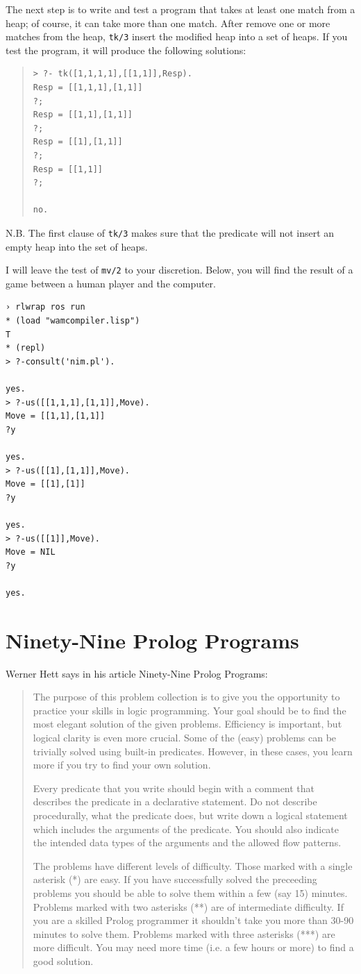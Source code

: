 \documentclass[a4paper,12pt]{book}
\begin{document}
The next step is to write and test a program that takes
at least one match from a heap; of course, it can take
more than one match. After remove one or more matches
from the heap, \verb|tk/3| insert the modified heap into
a set of heaps. If you test the program, it will produce
the following solutions:
\begin{quote}
\begin{verbatim}
> ?- tk([1,1,1,1],[[1,1]],Resp).
Resp = [[1,1,1],[1,1]]
?;
Resp = [[1,1],[1,1]]
?;
Resp = [[1],[1,1]]
?;
Resp = [[1,1]]
?;

no.
\end{verbatim}
\end{quote}
N.B. The first clause of \verb|tk/3| makes sure that the
predicate will not insert an empty heap into the set of heaps.

I will leave the test of \verb|mv/2| to your discretion.
Below, you will find the result of a game between a human
player and the computer.

\begin{verbatim}
› rlwrap ros run
* (load "wamcompiler.lisp")
T
* (repl)
> ?-consult('nim.pl').

yes.
> ?-us([[1,1,1],[1,1]],Move).
Move = [[1,1],[1,1]]
?y

yes.
> ?-us([[1],[1,1]],Move).
Move = [[1],[1]]
?y

yes.
> ?-us([[1]],Move).
Move = NIL
?y

yes.
\end{verbatim}

\chapter{Ninety-Nine Prolog Programs}
Werner Hett says in his article Ninety-Nine Prolog Programs:
\begin{quotation}
The purpose of this problem collection is to give you the
opportunity to practice your skills in logic programming.
Your goal should be to find the most elegant solution of
the given problems. Efficiency is important, but logical
clarity is even more crucial. Some of the (easy) problems
can be trivially solved using built-in predicates. However,
in these cases, you learn more if you try to find your own
solution.

Every predicate that you write should begin with a comment
that describes the predicate in a declarative statement.
Do not describe procedurally, what the predicate does, but
write down a logical statement which includes the arguments
of the predicate. You should also indicate the intended data
types of the arguments and the allowed flow patterns.

The problems have different levels of difficulty. Those marked
with a single asterisk (*) are easy. If you have successfully
solved the preceeding problems you should be able to solve
them within a few (say 15) minutes. Problems marked with two
asterisks (**) are of intermediate difficulty. If you are a
skilled Prolog programmer it shouldn't take you more than
30-90 minutes to solve them. Problems marked with three
asterisks (***) are more difficult. You may need more
time (i.e. a few hours or more) to find a good solution. 
\end{quotation}
\end{document}
